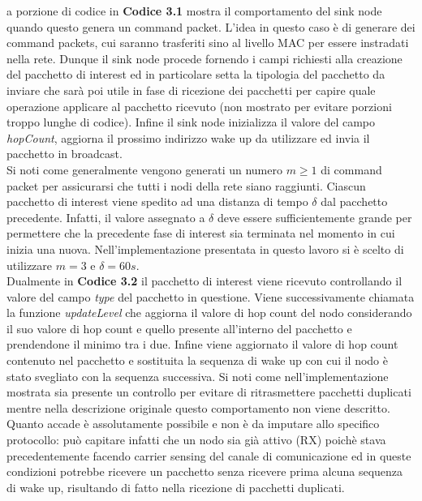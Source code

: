 \documentclass[binding=0.6cm,TFA]{sapthesis}
\begin{document}
\let\cleardoublepage    %

La porzione di codice in \textbf{Codice 3.1} mostra il comportamento del sink node quando questo genera un command packet. L'idea in questo caso è
di generare dei command packets, cui saranno trasferiti sino al livello MAC per essere instradati nella rete. Dunque il sink node procede
fornendo i campi richiesti alla creazione del pacchetto di interest ed in particolare setta la tipologia del pacchetto da inviare che sarà poi
utile in fase di ricezione dei pacchetti per capire quale operazione applicare al pacchetto ricevuto (non mostrato per evitare porzioni troppo lunghe di codice).
Infine il sink node inizializza il valore del campo \emph{hopCount}, aggiorna il prossimo indirizzo wake up da utilizzare ed invia il pacchetto in broadcast.\\

Si noti come generalmente vengono generati un numero $m \geq 1 $ di command packet per assicurarsi che tutti i nodi della rete siano raggiunti. Ciascun pacchetto
di interest viene spedito ad una distanza di tempo $\delta$ dal pacchetto precedente. Infatti, il valore assegnato a $\delta$ deve essere sufficientemente
grande per permettere che la precedente fase di interest sia terminata nel momento in cui inizia una nuova. Nell'implementazione presentata in questo lavoro
si è scelto di utilizzare $m=3$ e $\delta=60s$.\\

Dualmente in \textbf{Codice 3.2} il pacchetto di interest viene ricevuto controllando il valore del campo \emph{type} del pacchetto in questione. Viene
successivamente chiamata la funzione \emph{updateLevel} che aggiorna il valore di hop count del nodo considerando il suo valore di hop count
e quello presente all'interno del pacchetto e prendendone il minimo tra i due. Infine viene aggiornato il valore di hop count contenuto
nel pacchetto e sostituita la sequenza di wake up con cui il nodo è stato svegliato con la sequenza successiva. Si noti come 
nell'implementazione mostrata sia presente un controllo per evitare di ritrasmettere pacchetti duplicati mentre nella descrizione originale
questo comportamento non viene descritto. Quanto accade è assolutamente possibile e non è da imputare allo specifico protocollo: può capitare infatti
che un nodo sia già attivo (RX) poichè stava precedentemente facendo carrier sensing del canale di comunicazione ed in queste condizioni
potrebbe ricevere un pacchetto senza ricevere prima alcuna sequenza di wake up, risultando di fatto nella ricezione di pacchetti duplicati.
\end{document}
